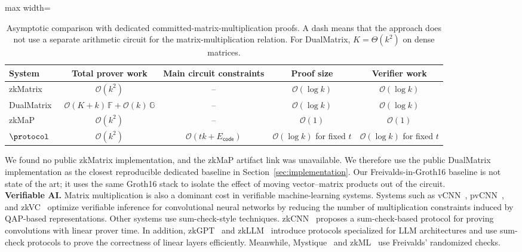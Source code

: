 \begin{table}[t]
\centering
\footnotesize
\begin{adjustbox}{max width=\textwidth}
\begin{tabular}{lcccc}
\toprule
\textbf{System} & \textbf{Total prover work} & \textbf{Main circuit constraints}
& \textbf{Proof size} & \textbf{Verifier work} \\
\midrule
zkMatrix~\cite{cong2024zkmatrix}
& \(\mathcal{O}(k^2)\) & -- & \(\mathcal{O}(\log k)\)
& \(\mathcal{O}(\log k)\) \\
DualMatrix~\cite{cong2026dualmatrix}
& \(\mathcal{O}(K+k)\,\mathbb{F}+\mathcal{O}(k)\,\mathbb{G}\) & --
& \(\mathcal{O}(\log k)\) & \(\mathcal{O}(\log k)\) \\
zkMaP~\cite{zkMaP}
& \(\mathcal{O}(k^2)\) & -- & \(\mathcal{O}(1)\)
& \(\mathcal{O}(1)\) \\
\(\protocol\)
& \(\mathcal{O}(k^2)\)
& \(\mathcal{O}(tk+E_{\mathsf{code}})\)
& \(\mathcal{O}(\log k)\) for fixed \(t\)
& \(\mathcal{O}(\log k)\) for fixed \(t\) \\
\bottomrule
\end{tabular}
\end{adjustbox}
\vspace{4pt}
\caption{Asymptotic comparison with dedicated committed-matrix-multiplication
proofs. A dash means that the approach does not use a separate arithmetic
circuit for the matrix-multiplication relation. For DualMatrix,
\(K=\Theta(k^2)\) on dense matrices.}
\label{tab:related-matrix-comparison}
\end{table}

We found no public zkMatrix implementation, and the zkMaP artifact link was
unavailable. We therefore use the public DualMatrix implementation as the
closest reproducible dedicated baseline in Section~\ref{sec:implementation}.
Our Freivalds-in-Groth16 baseline is not state of the art; it uses the same
Groth16 stack to isolate the effect of moving vector--matrix products out of
the circuit. \\

\noindent\textbf{Verifiable AI.}
Matrix multiplication is also a dominant cost in verifiable machine-learning
systems. Systems such as vCNN~\cite{lee2024vcnn}, pvCNN~\cite{pvCNN}, and
zkVC~\cite{zhang2025zkvc} optimize verifiable inference for convolutional neural
networks by reducing the number of multiplication constraints induced by
QAP-based representations. Other systems use sum-check-style techniques.
zkCNN~\cite{liu2021zkcnn} proposes a sum-check-based protocol for proving
convolutions with linear prover time. In addition, zkGPT~\cite{zkGPT} and
zkLLM~\cite{zkLLM} introduce protocols specialized for LLM architectures and
use sum-check protocols to prove the correctness of linear layers efficiently.
Meanwhile, Mystique~\cite{weng2021mystique} and zkML~\cite{chen2024zkml} use
Freivalds' randomized checks. \\

